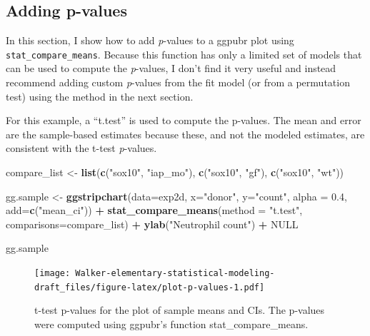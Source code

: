 \documentclass[]{book}
\newenvironment{Shaded}{\begin{snugshade}}{\end{snugshade}}
\newcommand{\DataTypeTok}[1]{\textcolor[rgb]{0.13,0.29,0.53}{#1}}
\newcommand{\FloatTok}[1]{\textcolor[rgb]{0.00,0.00,0.81}{#1}}
\newcommand{\KeywordTok}[1]{\textcolor[rgb]{0.13,0.29,0.53}{\textbf{#1}}}
\newcommand{\NormalTok}[1]{#1}
\newcommand{\OperatorTok}[1]{\textcolor[rgb]{0.81,0.36,0.00}{\textbf{#1}}}
\newcommand{\OtherTok}[1]{\textcolor[rgb]{0.56,0.35,0.01}{#1}}
\newcommand{\StringTok}[1]{\textcolor[rgb]{0.31,0.60,0.02}{#1}}
\begin{document}
\hypertarget{adding-p-values}{%
\subsection{Adding p-values}\label{adding-p-values}}

In this section, I show how to add \emph{p}-values to a ggpubr plot using \texttt{stat\_compare\_means}. Because this function has only a limited set of models that can be used to compute the \emph{p}-values, I don't find it very useful and instead recommend adding custom \emph{p}-values from the fit model (or from a permutation test) using the method in the next section.

For this example, a ``t.test'' is used to compute the p-values. The mean and error are the sample-based estimates because these, and not the modeled estimates, are consistent with the t-test \emph{p}-values.

\begin{Shaded}
\begin{Highlighting}[]
\NormalTok{compare_list <-}\StringTok{ }\KeywordTok{list}\NormalTok{(}\KeywordTok{c}\NormalTok{(}\StringTok{"sox10"}\NormalTok{, }\StringTok{"iap_mo"}\NormalTok{), }\KeywordTok{c}\NormalTok{(}\StringTok{"sox10"}\NormalTok{, }\StringTok{"gf"}\NormalTok{), }\KeywordTok{c}\NormalTok{(}\StringTok{"sox10"}\NormalTok{, }\StringTok{"wt"}\NormalTok{))}

\NormalTok{gg.sample <-}\StringTok{ }\KeywordTok{ggstripchart}\NormalTok{(}\DataTypeTok{data=}\NormalTok{exp2d,}
          \DataTypeTok{x=}\StringTok{"donor"}\NormalTok{, }
          \DataTypeTok{y=}\StringTok{"count"}\NormalTok{,}
          \DataTypeTok{alpha =} \FloatTok{0.4}\NormalTok{,}
          \DataTypeTok{add=}\KeywordTok{c}\NormalTok{(}\StringTok{"mean_ci"}\NormalTok{)) }\OperatorTok{+}
\StringTok{  }\KeywordTok{stat_compare_means}\NormalTok{(}\DataTypeTok{method =} \StringTok{"t.test"}\NormalTok{, }\DataTypeTok{comparisons=}\NormalTok{compare_list) }\OperatorTok{+}
\StringTok{  }\KeywordTok{ylab}\NormalTok{(}\StringTok{"Neutrophil count"}\NormalTok{) }\OperatorTok{+}
\StringTok{  }\OtherTok{NULL}

\NormalTok{gg.sample}
\end{Highlighting}
\end{Shaded}

\begin{figure}
\centering
\texttt{[image: Walker-elementary-statistical-modeling-draft\_files/figure-latex/plot-p-values-1.pdf]}
\caption{\label{fig:plot-p-values}t-test p-values for the plot of sample means and CIs. The p-values were computed using ggpubr's function stat\_compare\_means.}
\end{figure}
\end{document}
